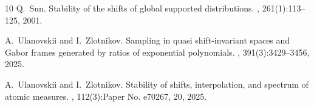 \documentclass[12pt]{amsart}
\numberwithin{equation}{section}
\begin{document}
\begin{thebibliography}{10}
Q.~Sun.
\newblock Stability of the shifts of global supported distributions.
, 261(1):113--125, 2001.

A.~Ulanovskii and I.~Zlotnikov.
\newblock Sampling in quasi shift-invariant spaces and {G}abor frames generated by ratios of exponential polynomials.
, 391(3):3429--3456, 2025.

A.~Ulanovskii and I.~Zlotnikov.
\newblock Stability of shifts, interpolation, and spectrum of atomic measures.
, 112(3):Paper No. e70267, 20, 2025.

\end{thebibliography}
\end{document}
